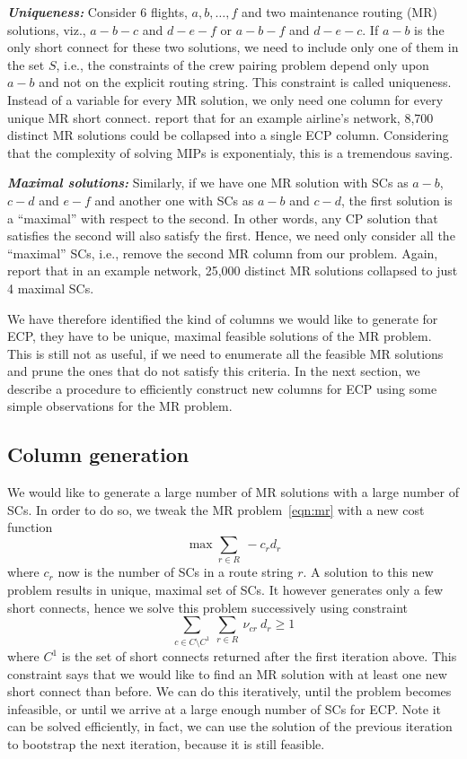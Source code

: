 \documentclass[letterpaper, 10pt, twocolumn, reqno]{amsart}
\begin{document}
\textbf{\emph{Uniqueness:}} Consider 6 flights, $a, b, \ldots, f$ and two maintenance routing (MR) solutions, viz., $a-b-c$ and $d-e-f$ or $a-b-f$ and $d-e-c$. If $a-b$ is the only short connect for these two solutions, we need to include only one of them in the set $S$, i.e., the constraints of the crew pairing problem depend only upon $a-b$ and not on the explicit routing string. This constraint is called uniqueness. Instead of a variable for every MR solution, we only need one column for every unique MR short connect. \cite{cohn2003improving} report that for an example airline's network, 8,700 distinct MR solutions could be collapsed into a single ECP column. Considering that the complexity of solving MIPs is exponentialy, this is a tremendous saving.

\textbf{\emph{Maximal solutions:}} Similarly, if we have one MR solution with SCs as $a-b$, $c-d$ and $e-f$ and another one with SCs as $a-b$ and $c-d$, the first solution is a ``maximal'' with respect to the second. In other words, any CP solution that satisfies the second will also satisfy the first. Hence, we need only consider all the ``maximal'' SCs, i.e., remove the second MR column from our problem. Again,~\cite{cohn2003improving} report that in an example network, 25,000 distinct MR solutions collapsed to just 4 maximal SCs.

We have therefore identified the kind of columns we would like to generate for ECP, they have to be unique, maximal feasible solutions of the MR problem. This is still not as useful, if we need to enumerate all the feasible MR solutions and prune the ones that do not satisfy this criteria. In the next section, we describe a procedure to efficiently construct new columns for ECP using some simple observations for the MR problem.

\subsection{Column generation}
\label{ssec:col_gen_ecp}

We would like to generate a large number of MR solutions with a large number of SCs. In order to do so, we tweak the MR problem~\eqref{eqn:mr} with a new cost function
$$
\max \sum_{r \in R}\ -c_r d_r
$$
where $c_r$ now is the number of SCs in a route string $r$. A solution to this new problem results in unique, maximal set of SCs. It however generates only a few short connects, hence we solve this problem successively using constraint
$$
\sum_{c \in C\setminus C^1}\ \sum_{r \in R}\ \nu_{cr}\ d_r \geq 1
$$
where $C^1$ is the set of short connects returned after the first iteration above. This constraint says that we would like to find an MR solution with at least one new short connect than before. We can do this iteratively, until the problem becomes infeasible, or until we arrive at a large enough number of SCs for ECP. Note it can be solved efficiently, in fact, we can use the solution of the previous iteration to bootstrap the next iteration, because it is still feasible.
\end{document}
